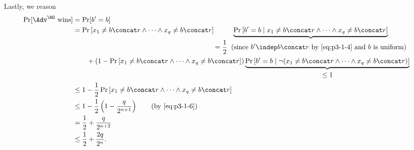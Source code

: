 \begin{answer}[i]
    Lastly, we reason
    \begin{align*}
        \Pr[\Adv^{\RO} \textrm{ wins}] 
        &= \Pr[b'=b]\\
        &= \Pr\left[x_1\neq b\concat r\land \cdots \land x_{q}\neq b\concat r \right] \underbrace{\Pr\left[b'=b\mid x_1\neq b\concat r\land \cdots \land x_{q}\neq b\concat r \right]}_{\begin{aligned}=\frac{1}{2}\;\; (\textrm{since $b'\indep b\concat r$ by \eqref{eq:p3-1-4} and $b$ is uniform})\end{aligned}}\\
        &\qquad +\left(1-\Pr\left[x_1\neq b\concat r\land \cdots \land x_{q}\neq b\concat r \right]\right) \underbrace{\Pr\left[b'=b\mid \neg( x_1\neq b\concat r\land \cdots \land x_{q}\neq b\concat r) \right]}_{\begin{aligned}\le 1\end{aligned}}\\
        &\le 1 - \frac{1}{2}\Pr\left[x_1\neq b\concat r\land \cdots \land x_{q}\neq b\concat r \right]\\
        &\le 1- \frac{1}{2}\left(1-\frac{q}{2^{n+1}}\right)
        \qquad (\textrm{by \eqref{eq:p3-1-6}})\\
        &= \frac{1}{2}+\frac{q}{2^{n+2}}\\
        &\le \frac{1}{2}+\frac{2q}{2^n}.
    \end{align*}
    
\end{answer}





